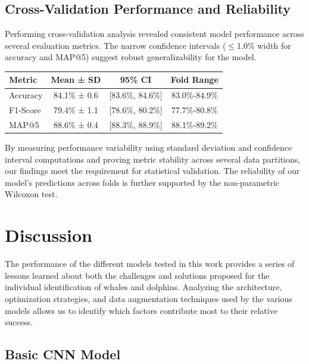 \documentclass[twocolumn]{article}
\begin{document}
\subsection{Cross-Validation Performance and Reliability}

Performing cross-validation analysis revealed consistent model performance across several evaluation metrics. The narrow confidence intervals (\(\leq\)1.0\% width for accuracy and MAP@5) suggest robust generalizability for the model.

\begin{table}
\begin{tabular}{l c c c}
\hline
\textbf{Metric} & \textbf{Mean ± SD} & \textbf{95\% CI} & \textbf{Fold Range} \\ \hline
Accuracy & 84.1\% ± 0.6 & [83.6\%, 84.6\%] & 83.0\%-84.9\% \\
F1-Score & 79.4\% ± 1.1 & [78.6\%, 80.2\%] & 77.7\%-80.8\% \\
MAP@5 & 88.6\% ± 0.4 & [88.3\%, 88.9\%] & 88.1\%-89.2\% \\ \hline
\end{tabular}
\end{table}

By measuring performance variability using standard deviation and confidence interval computations and proving metric stability across several data partitions, our findings meet the requirement for statistical validation. The reliability of our model's predictions across folds is further supported by the non-parametric Wilcoxon test. 

\section{Discussion}

The performance of the different models tested in this work provides a series of lessons learned about both the challenges and solutions proposed for the individual identification of whales and dolphins. Analyzing the architecture, optimization strategies, and data augmentation techniques used by the various models allows us to identify which factors contribute most to their relative success.

\subsection{Basic CNN Model}
\end{document}
